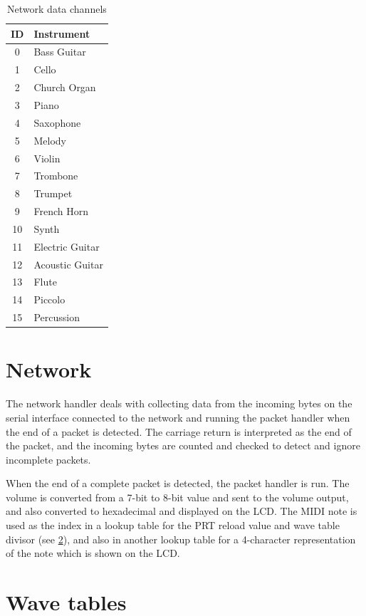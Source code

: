 \begin{nowordcount}
\begin{table}[htbp]
\centering
\begin{tabular}[bp]{c l}
ID & Instrument \\
\hline
0 & Bass Guitar \\
1 & Cello \\
2 & Church Organ \\
3 & Piano \\
4 & Saxophone \\
5 & Melody \\
6 & Violin \\
7 & Trombone \\
8 & Trumpet \\
9 & French Horn \\
10 & Synth \\
11 & Electric Guitar \\
12 & Acoustic Guitar \\
13 & Flute \\
14 & Piccolo \\
15 & Percussion
\end{tabular}
\caption{Network data channels}\label{tab:channelids}
\end{table}
\end{nowordcount}

\section{Network}

The network handler deals with collecting data from the incoming bytes on the serial interface 
connected to the network and running the packet handler when the end of a packet is detected.  The 
carriage return is interpreted as the end of the packet, and the incoming bytes are counted and 
checked to detect and ignore incomplete packets.

When the end of a complete packet is detected, the packet handler is run.  The volume is converted 
from a 7-bit to 8-bit value and sent to the volume output, and also converted to hexadecimal and 
displayed on the LCD.  The MIDI note is used as the index in a lookup table for the PRT reload value 
and wave table divisor (see \ref{wavetables}), and also in another lookup table for a 4-character 
representation of the note which is shown on the LCD.

\section{Wave tables}
\label{wavetables}

